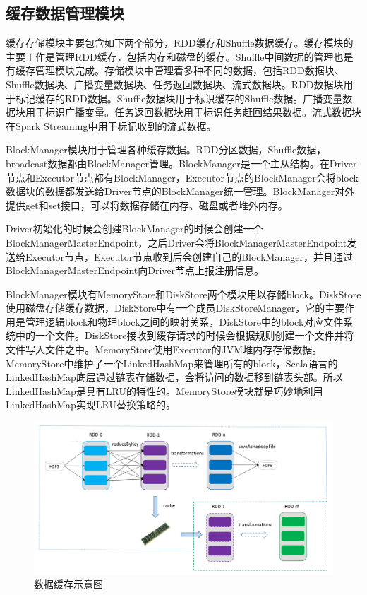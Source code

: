 \subsection{缓存数据管理模块}

缓存存储模块主要包含如下两个部分，RDD缓存和Shuffle数据缓存。缓存模块的主要工作是管理RDD缓存，包括内存和磁盘的缓存。Shuffle中间数据的管理也是有缓存管理模块完成。存储模块中管理着多种不同的数据，包括RDD数据块、Shuffle数据块、广播变量数据块、任务返回数据块、流式数据块。RDD数据块用于标记缓存的RDD数据。Shuffle数据块用于标识缓存的Shuffle数据。广播变量数据块用于标识广播变量。任务返回数据块用于标识任务赶回结果数据。流式数据块在Spark Streaming中用于标记收到的流式数据。

BlockManager模块用于管理各种缓存数据。RDD分区数据，Shuffle数据，broadcast数据都由BlockManager管理。BlockManager是一个主从结构。在Driver节点和Executor节点都有BlockManager，Executor节点的BlockManager会将block数据块的数据都发送给Driver节点的BlockManager统一管理。BlockManager对外提供get和set接口，可以将数据存储在内存、磁盘或者堆外内存。

Driver初始化的时候会创建BlockManager的时候会创建一个BlockManagerMasterEndpoint，之后Driver会将BlockManagerMasterEndpoint发送给Executor节点，Executor节点收到后会创建自己的BlockManager，并且通过BlockManagerMasterEndpoint向Driver节点上报注册信息。


BlockManager模块有MemoryStore和DiskStore两个模块用以存储block。DiskStore使用磁盘存储缓存数据，DiskStore中有一个成员DiskStoreManager，它的主要作用是管理逻辑block和物理block之间的映射关系，DiskStore中的block对应文件系统中的一个文件。DiskStore接收到缓存请求的时候会根据规则创建一个文件并将文件写入文件之中。MemoryStore使用Executor的JVM堆内存存储数据。MemoryStore中维护了一个LinkedHashMap来管理所有的block，Scala语言的LinkedHashMap底层通过链表存储数据，会将访问的数据移到链表头部。所以LinkedHashMap是具有LRU的特性的。MemoryStore模块就是巧妙地利用LinkedHashMap实现LRU替换策略的。

\begin{figure}[htbp]
    \centering
    \includegraphics[width=1\textwidth]{Img/rdd-cache.png}
    \caption{数据缓存示意图}
    \label{fig:rdd-cache}
\end{figure}

